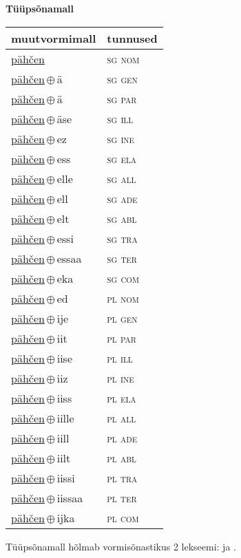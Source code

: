 

\vspace{3.5em}
\noindent \begin{minipage}{\textwidth}
\noindent \textbf{Tüüpsõnamall \,}\\

\begin{sideways}
\begin{tabular}{l l}
muutvormimall & tunnused \\
\hline
\underline{pähčen} & \textsc{ sg nom } \\
\underline{pähčen}\,$\oplus$\,ä & \textsc{ sg gen } \\
\underline{pähčen}\,$\oplus$\,ä & \textsc{ sg par } \\
\underline{pähčen}\,$\oplus$\,äse & \textsc{ sg ill } \\
\underline{pähčen}\,$\oplus$\,ez & \textsc{ sg ine } \\
\underline{pähčen}\,$\oplus$\,ess & \textsc{ sg ela } \\
\underline{pähčen}\,$\oplus$\,elle & \textsc{ sg all } \\
\underline{pähčen}\,$\oplus$\,ell & \textsc{ sg ade } \\
\underline{pähčen}\,$\oplus$\,elt & \textsc{ sg abl } \\
\underline{pähčen}\,$\oplus$\,essi & \textsc{ sg tra } \\
\underline{pähčen}\,$\oplus$\,essaa & \textsc{ sg ter } \\
\underline{pähčen}\,$\oplus$\,eka & \textsc{ sg com } \\
\underline{pähčen}\,$\oplus$\,ed & \textsc{ pl nom } \\
\underline{pähčen}\,$\oplus$\,ije & \textsc{ pl gen } \\
\underline{pähčen}\,$\oplus$\,iit & \textsc{ pl par } \\
\underline{pähčen}\,$\oplus$\,iise & \textsc{ pl ill } \\
\underline{pähčen}\,$\oplus$\,iiz & \textsc{ pl ine } \\
\underline{pähčen}\,$\oplus$\,iiss & \textsc{ pl ela } \\
\underline{pähčen}\,$\oplus$\,iille & \textsc{ pl all } \\
\underline{pähčen}\,$\oplus$\,iill & \textsc{ pl ade } \\
\underline{pähčen}\,$\oplus$\,iilt & \textsc{ pl abl } \\
\underline{pähčen}\,$\oplus$\,iissi & \textsc{ pl tra } \\
\underline{pähčen}\,$\oplus$\,iissaa & \textsc{ pl ter } \\
\underline{pähčen}\,$\oplus$\,ijka & \textsc{ pl com } \\
\end{tabular}
\end{sideways}
\label{tab:tüüpsõnamall-pähčen}

\end{minipage}

 
\vspace{1em}
\noindent Tüüpsõnamall  hõlmab vormisõnastikus 2 lekseemi:  ja .
